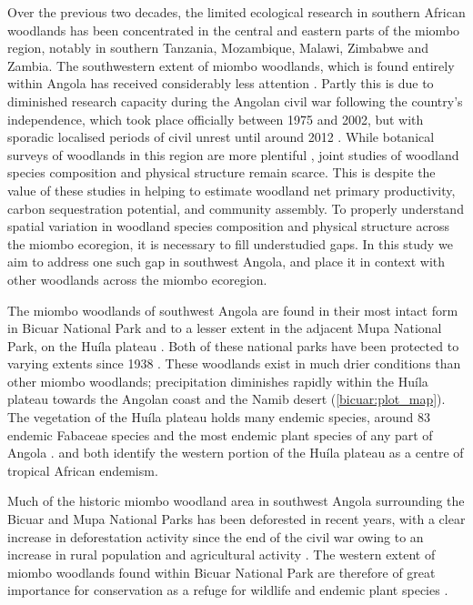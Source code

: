 \begin{refsection}
Over the previous two decades, the limited ecological research in southern African woodlands has been concentrated in the central and eastern parts of the miombo region, notably in southern Tanzania, Mozambique, Malawi, Zimbabwe and Zambia. The southwestern extent of miombo woodlands, which is found entirely within Angola has received considerably less attention \citep{Huntley2019}. Partly this is due to diminished research capacity during the Angolan civil war following the country's independence, which took place officially between 1975 and 2002, but with sporadic localised periods of civil unrest until around 2012 \citep{Oliveira2015}. While botanical surveys of woodlands in this region are more plentiful \citep{Huntley2019, Figueiredo2009}, joint studies of woodland species composition and physical structure remain scarce. This is despite the value of these studies in helping to estimate woodland net primary productivity, carbon sequestration potential, and community assembly. To properly understand spatial variation in woodland species composition and physical structure across the miombo ecoregion, it is necessary to fill understudied gaps. In this study we aim to address one such gap in southwest Angola, and place it in context with other woodlands across the miombo ecoregion.

The miombo woodlands of southwest Angola are found in their most intact form in Bicuar National Park and to a lesser extent in the adjacent Mupa National Park, on the Hu\'{i}la plateau \citep{Chisingui2018}. Both of these national parks have been protected to varying extents since 1938 \citep{Huntley2019}. These woodlands exist in much drier conditions than other miombo woodlands; precipitation diminishes rapidly within the Hu\'{i}la plateau towards the Angolan coast and the Namib desert (\autoref{bicuar:plot_map}). The vegetation of the Hu\'{i}la plateau holds many endemic species, around 83 endemic Fabaceae species \citep{Soares2007} and the most endemic plant species of any part of Angola \citep{Figueiredo2008}. \citet{Linder2001} and \citet{Droissart2018} both identify the western portion of the Hu\'{i}la plateau as a centre of tropical African endemism.

Much of the historic miombo woodland area in southwest Angola surrounding the Bicuar and Mupa National Parks has been deforested in recent years, with a clear increase in deforestation activity since the end of the civil war owing to an increase in rural population and agricultural activity \citep{Schneibel2013, Huntley2019}. The western extent of miombo woodlands found within Bicuar National Park are therefore of great importance for conservation as a refuge for wildlife and endemic plant species \citep{Huntley2019, Silva2020}.


\end{refsection}
